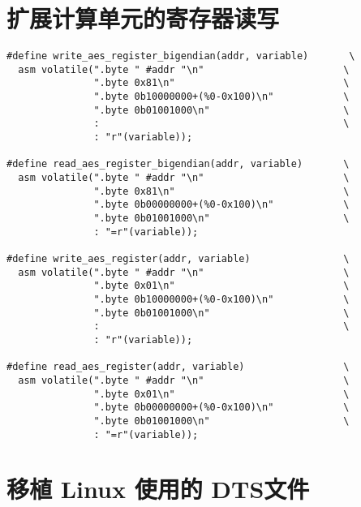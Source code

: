 \section{扩展计算单元的寄存器读写}
\label{sec:cp2-rw}
\begin{verbatim}
#define write_aes_register_bigendian(addr, variable)       \
  asm volatile(".byte " #addr "\n"                        \
               ".byte 0x81\n"                             \
               ".byte 0b10000000+(%0-0x100)\n"            \
               ".byte 0b01001000\n"                       \
               :                                          \
               : "r"(variable));

#define read_aes_register_bigendian(addr, variable)       \
  asm volatile(".byte " #addr "\n"                        \
               ".byte 0x81\n"                             \
               ".byte 0b00000000+(%0-0x100)\n"            \
               ".byte 0b01001000\n"                       \
               : "=r"(variable));

#define write_aes_register(addr, variable)                \
  asm volatile(".byte " #addr "\n"                        \
               ".byte 0x01\n"                             \
               ".byte 0b10000000+(%0-0x100)\n"            \
               ".byte 0b01001000\n"                       \
               :                                          \
               : "r"(variable));

#define read_aes_register(addr, variable)                 \
  asm volatile(".byte " #addr "\n"                        \
               ".byte 0x01\n"                             \
               ".byte 0b00000000+(%0-0x100)\n"            \
               ".byte 0b01001000\n"                       \
               : "=r"(variable));
\end{verbatim}

\section{移植 Linux 使用的 DTS文件}
\label{sec:trivialmips-dts}

